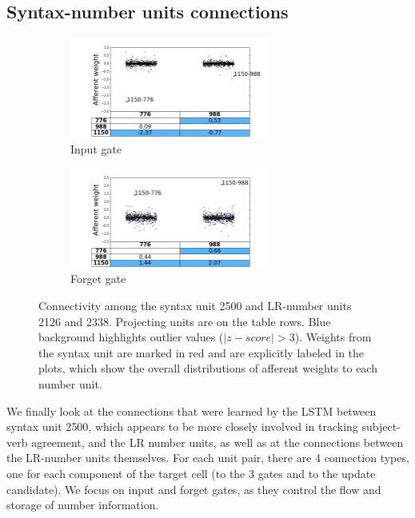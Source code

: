 \subsection{Syntax-number units connections}

\begin{figure}[t]
    \centering
    \begin{subfigure}{0.49\textwidth}
            \centering
            \includegraphics[height=3.3cm,width=\textwidth]{Figures/gate_Input_afferent_interactions.png}
            \caption{Input gate}
            \label{fig:interaction-input}
    \end{subfigure}
    \begin{subfigure}{0.49\textwidth}
           \centering
          \includegraphics[height=3.3cm,width=\textwidth]{Figures/gate_Forget_afferent_interactions.png}
          \caption{Forget gate}
          \label{fig:interaction-forget}
    \end{subfigure}
    \caption{Connectivity among the syntax unit \unit{2}{500} and
      LR-number units \unit{2}{126} and \unit{2}{338}. Projecting
      units are on the table rows. Blue background highlights outlier
      values ($|z-score|>3$). Weights from the syntax unit are marked in red
      and are explicitly labeled in the plots, which show the overall distributions of afferent weights to each number unit.}
\label{fig:interaction}
\end{figure}

We finally look at the connections that were learned by the LSTM
between syntax unit \unit{2}{500}, which appears to be more closely involved in
tracking subject-verb agreement, and the LR number units, as well as at
the connections between the LR-number units themselves. For each unit pair, there are 4
connection types, one for each component of the target cell (to the 3
gates and to the update candidate). We focus on input and forget gates, as they control the flow and storage of number information.

